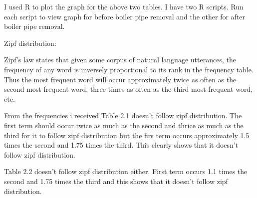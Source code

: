 \documentclass[12pt]{article} %
\begin{document}
I used R to plot the graph for the above two tables. I have two R scripts. Run each script to view graph for before boiler pipe removal and the other for after boiler pipe removal.

Zipf distribution: 

Zipf's law states that given some corpus of natural language utterances, the frequency of any word is inversely proportional to its rank in the frequency table. Thus the most frequent word will occur approximately twice as often as the second most frequent word, three times as often as the third most frequent word, etc.

From the frequencies i received Table 2.1 doesn't follow zipf distribution. The first term should occur twice as much as the second and thrice as much as the third for it to follow zipf distribution but the firs term occurs approximately 1.5 times the second and 1.75 times the third. This clearly shows that it doesn't follow zipf distribution.

Table 2.2 doesn't follow zipf distribution either. First term occurs 1.1 times the second and 1.75 times the third and this shows that it doesn't follow zipf distribution. 












\end{document}
